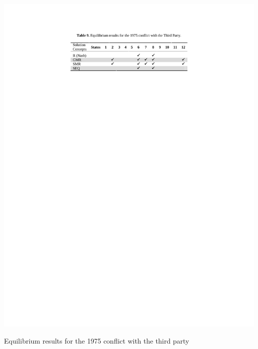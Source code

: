 \documentclass[letterpaper,12pt,titlepage,oneside,final]{book}
\begin{document}
\begin{table}[H]
\centering
\includegraphics[scale=1]{PDF-IMG/tables/9.pdf}

\caption{Equilibrium results for the 1975 conflict with the third party}

\label{tbl:t9}
\end{table}
\end{document}
